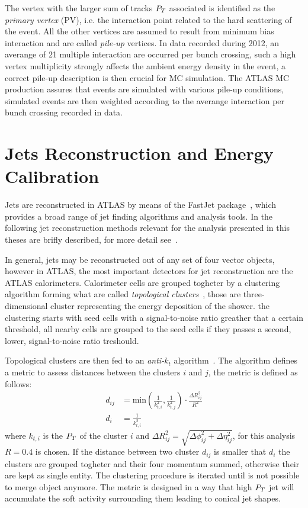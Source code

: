 The vertex with the larger sum of tracks $P_{T}$ associated is identified as the \emph{primary vertex} (PV), 
i.e. the interaction point related to the hard scattering of the event. All the other vertices are assumed to result from
minimum bias interaction and are called \emph{pile-up} vertices.
In data recorded during 2012, an averange of 21 multiple interaction are occurred per bunch crossing,
such a high vertex multiplicity strongly affects the ambient energy density in the event, 
a correct pile-up description is then crucial for MC simulation. The ATLAS MC production assures that events 
are simulated with various pile-up conditions, simulated events are then weighted according to the averange interaction
per bunch crossing recorded in data.


\section{Jets Reconstruction and Energy Calibration}
Jets are reconstructed in ATLAS by means of the FastJet package~\cite{fastjet}, 
which provides a broad range of jet finding algorithms and analysis tools. 
In the following jet reconstruction methods relevant for the
analysis presented in this theses are brifly described, for more detail see~\cite{AtlasCSCBook}.

In general, jets may be reconstructed out of any set of four vector objects, 
however in ATLAS, the most important detectors for jet reconstruction are the ATLAS calorimeters.
Calorimeter cells are grouped togheter by a clustering algorithm forming what are called \emph{topological clusters}~\cite{TopoClusterAlgo},
those are three-dimensional cluster representing the energy deposition of the shower.
the clustering starts with seed cells with a signal-to-noise ratio greather that a certain threshold, 
all nearby cells are grouped to the seed cells if they passes a second, lower, signal-to-noise ratio treshould.

Topological clusters are then fed to an \emph{anti-$k_t$} algorithm~\cite{antikt}. The algorithm defines a metric
to assess distances between the clusters $i$ and $j$, the metric is defined as follows:
\begin{align}
d_{ij} &= \text{min}(\frac{1}{k_{t,i}^2}, \frac{1}{k_{t,j}^2}) \cdot \frac{\Delta R_{ij}^2}{R^2}  \\
d_i   &= \frac{1}{k_{t,i}^2} 
\end{align}
where $k_{t,i}$ is the $P_{T}$ of the cluster $i$ and $\Delta R_{ij}^2 = \sqrt{\Delta\phi_{ij}^2 + \Delta\eta_{ij}^2}$, for
this analysis $R=0.4$ is chosen.
If the distance between two cluster $d_{ij}$ is smaller that $d_i$ the clusters are grouped togheter and their four momentum
summed, otherwise their are kept as single entity. The clustering procedure is iterated until is not possible to merge object
anymore. The metric is designed in a way that high $P_{T}$ jet will accumulate the soft activity surrounding them leading to conical
jet shapes. 

